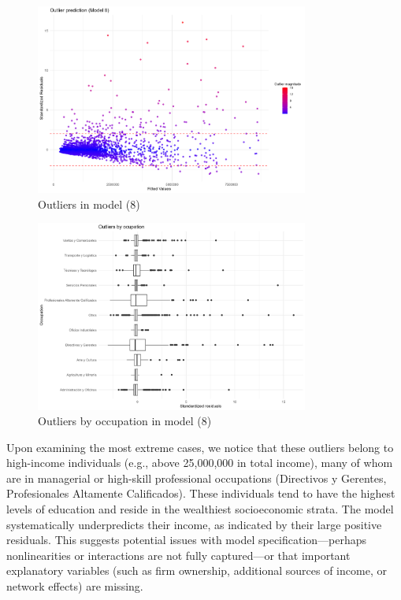 \documentclass[a4paper,12pt]{article}
\begin{document}
\begin{figure}[H]
    \centering
    \caption{Outliers in model (8)}
    \label{fig:residuals vs fitted}
    \includegraphics[width=0.8\textwidth]{resid_vs_fitted.jpg}
\end{figure}
\begin{figure}[H]
    \centering
    \caption{Outliers by occupation in model (8)}
    \label{fig:outliers}
    \includegraphics[width=0.8\textwidth]{out_by_ocup.jpg}
\end{figure}
Upon examining the most extreme cases, we notice that these outliers belong to high-income individuals (e.g., above 25,000,000 in total income), many of whom are in managerial or high-skill professional occupations (Directivos y Gerentes, Profesionales Altamente Calificados). These individuals tend to have the highest levels of education and reside in the wealthiest socioeconomic strata. The model systematically underpredicts their income, as indicated by their large positive residuals. This suggests potential issues with model specification—perhaps nonlinearities or interactions are not fully captured—or that important explanatory variables (such as firm ownership, additional sources of income, or network effects) are missing.
\end{document}

